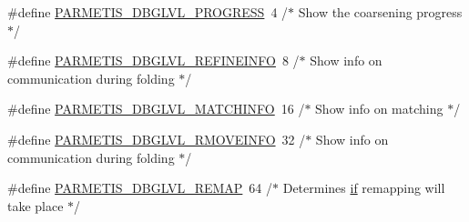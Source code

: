 \begin{DoxyCompactItemize}
\item 
\#define \hyperlink{a00840_a6913cca439f729f0d831646979505f71}{P\+A\+R\+M\+E\+T\+I\+S\+\_\+\+D\+B\+G\+L\+V\+L\+\_\+\+P\+R\+O\+G\+R\+E\+SS}~4      /$\ast$ Show the coarsening progress $\ast$/
\item 
\#define \hyperlink{a00840_a483143525f038b8d1cc9876e104b2228}{P\+A\+R\+M\+E\+T\+I\+S\+\_\+\+D\+B\+G\+L\+V\+L\+\_\+\+R\+E\+F\+I\+N\+E\+I\+N\+FO}~8      /$\ast$ Show info on communication during folding $\ast$/
\item 
\#define \hyperlink{a00840_a2c17217243390b94295386f8cb1f853d}{P\+A\+R\+M\+E\+T\+I\+S\+\_\+\+D\+B\+G\+L\+V\+L\+\_\+\+M\+A\+T\+C\+H\+I\+N\+FO}~16     /$\ast$ Show info on matching $\ast$/
\item 
\#define \hyperlink{a00840_aff381af99e792c5a07a391f18bc1a6ea}{P\+A\+R\+M\+E\+T\+I\+S\+\_\+\+D\+B\+G\+L\+V\+L\+\_\+\+R\+M\+O\+V\+E\+I\+N\+FO}~32     /$\ast$ Show info on communication during folding $\ast$/
\item 
\#define \hyperlink{a00840_a38aa880d4f8c0dbda1800f21f606a1e1}{P\+A\+R\+M\+E\+T\+I\+S\+\_\+\+D\+B\+G\+L\+V\+L\+\_\+\+R\+E\+M\+AP}~64     /$\ast$ Determines \hyperlink{a00614_a96c738d3e2120c4273f9d4390761d99e}{if} remapping will take place $\ast$/
\end{DoxyCompactItemize}
